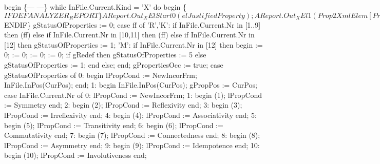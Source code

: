 begin  \{---  ---\}
   while InFile.Current.Kind = 'X' do
   begin
      \{$IFDEF ANALYZER_REPORT\}
      AReport.Out_XElStart0(elJustifiedProperty);
      AReport.Out_XEl1(Prop2XmlElem[ PropertyKind(InFile.Current.Nr)]);
      \{$ENDIF\}
      gStatusOfProperties := 0;
      case ff of
         'R','K':
            if InFile.Current.Nr in [1..9] then (ff) else
               if InFile.Current.Nr in [10,11] then (ff)
               else if InFile.Current.Nr in [12] then
                  gStatusOfProperties := 1;
         'M':
            if InFile.Current.Nr in [12] then
            begin
                := 0;
                := 0;
                := 0;
                := 0;
               if gRedef then
                  gStatusOfProperties := 5
               else gStatusOfProperties := 1;
            end
            else;
      end;
      gPropertiesOcc := true;
      case gStatusOfProperties of
         0:
            begin
               lPropCond := NewIncorFrm;
               InFile.InPos(CurPos);
            end;
         1:
            begin InFile.InPos(CurPos); gPropPos := CurPos;
            case InFile.Current.Nr of
               0: lPropCond := NewIncorFrm;
               1:  begin (1);  lPropCond := Symmetry end;
               2:  begin (2);  lPropCond := Reflexivity end;
               3:  begin (3);  lPropCond := Irreflexivity end;
               4:  begin (4);  lPropCond := Associativity end;
               5:  begin (5);  lPropCond := Transitivity end;
               6:  begin (6);  lPropCond := Commutativity end;
               7:  begin (7);  lPropCond := Connectedness end;
               8:  begin (8);  lPropCond := Asymmetry end;
               9:  begin (9);  lPropCond := Idempotence end;
               10: begin (10); lPropCond := Involutiveness end;
